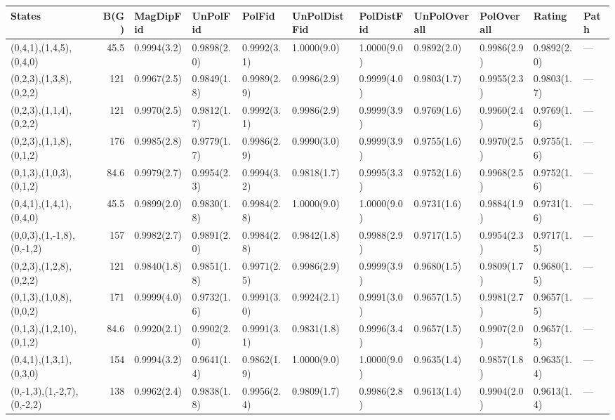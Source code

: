 \begin{tabular}{lrlllllllll}
\hline
 States                     &   B(G) & MagDipFid   & UnPolFid    & PolFid      & UnPolDistFid   & PolDistFid   & UnPolOverall   & PolOverall   & Rating      & Path   \\
\hline
 (0,4,1),(1,4,5),(0,4,0)    &   45.5 & 0.9994(3.2) & 0.9898(2.0) & 0.9992(3.1) & 1.0000(9.0)    & 1.0000(9.0)  & 0.9892(2.0)    & 0.9986(2.9)  & 0.9892(2.0) & ---    \\
 (0,2,3),(1,3,8),(0,2,2)    &  121   & 0.9967(2.5) & 0.9849(1.8) & 0.9989(2.9) & 0.9986(2.9)    & 0.9999(4.0)  & 0.9803(1.7)    & 0.9955(2.3)  & 0.9803(1.7) & ---    \\
 (0,2,3),(1,1,4),(0,2,2)    &  121   & 0.9970(2.5) & 0.9812(1.7) & 0.9992(3.1) & 0.9986(2.9)    & 0.9999(3.9)  & 0.9769(1.6)    & 0.9960(2.4)  & 0.9769(1.6) & ---    \\
 (0,2,3),(1,1,8),(0,1,2)    &  176   & 0.9985(2.8) & 0.9779(1.7) & 0.9986(2.9) & 0.9990(3.0)    & 0.9999(3.9)  & 0.9755(1.6)    & 0.9970(2.5)  & 0.9755(1.6) & ---    \\
 (0,1,3),(1,0,3),(0,1,2)    &   84.6 & 0.9979(2.7) & 0.9954(2.3) & 0.9994(3.2) & 0.9818(1.7)    & 0.9995(3.3)  & 0.9752(1.6)    & 0.9968(2.5)  & 0.9752(1.6) & ---    \\
 (0,4,1),(1,4,1),(0,4,0)    &   45.5 & 0.9899(2.0) & 0.9830(1.8) & 0.9984(2.8) & 1.0000(9.0)    & 1.0000(9.0)  & 0.9731(1.6)    & 0.9884(1.9)  & 0.9731(1.6) & ---    \\
 (0,0,3),(1,-1,8),(0,-1,2)  &  157   & 0.9982(2.7) & 0.9891(2.0) & 0.9984(2.8) & 0.9842(1.8)    & 0.9988(2.9)  & 0.9717(1.5)    & 0.9954(2.3)  & 0.9717(1.5) & ---    \\
 (0,2,3),(1,2,8),(0,2,2)    &  121   & 0.9840(1.8) & 0.9851(1.8) & 0.9971(2.5) & 0.9986(2.9)    & 0.9999(3.9)  & 0.9680(1.5)    & 0.9809(1.7)  & 0.9680(1.5) & ---    \\
 (0,1,3),(1,0,8),(0,0,2)    &  171   & 0.9999(4.0) & 0.9732(1.6) & 0.9991(3.0) & 0.9924(2.1)    & 0.9991(3.0)  & 0.9657(1.5)    & 0.9981(2.7)  & 0.9657(1.5) & ---    \\
 (0,1,3),(1,2,10),(0,1,2)   &   84.6 & 0.9920(2.1) & 0.9902(2.0) & 0.9991(3.1) & 0.9831(1.8)    & 0.9996(3.4)  & 0.9657(1.5)    & 0.9907(2.0)  & 0.9657(1.5) & ---    \\
 (0,4,1),(1,3,1),(0,3,0)    &  154   & 0.9994(3.2) & 0.9641(1.4) & 0.9862(1.9) & 1.0000(9.0)    & 1.0000(9.0)  & 0.9635(1.4)    & 0.9857(1.8)  & 0.9635(1.4) & ---    \\
 (0,-1,3),(1,-2,7),(0,-2,2) &  138   & 0.9962(2.4) & 0.9838(1.8) & 0.9956(2.4) & 0.9809(1.7)    & 0.9986(2.8)  & 0.9613(1.4)    & 0.9904(2.0)  & 0.9613(1.4) & ---    \\

\end{tabular}
